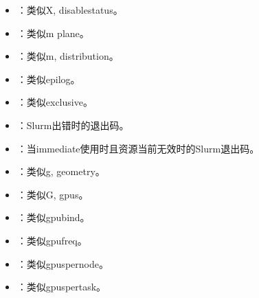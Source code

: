 \documentclass[a4paper,12pt,english]{sphinxmanual}
\begin{document}
\begin{itemize}
\item {} 
\sphinxAtStartPar
{}：类似\sphinxhyphen{}X, \sphinxhyphen{}\sphinxhyphen{}disable\sphinxhyphen{}status。

\item {} 
\sphinxAtStartPar
{}：类似\sphinxhyphen{}m plane。

\item {} 
\sphinxAtStartPar
{}：类似\sphinxhyphen{}m, \sphinxhyphen{}\sphinxhyphen{}distribution。

\item {} 
\sphinxAtStartPar
{}：类似\sphinxhyphen{}\sphinxhyphen{}epilog。

\item {} 
\sphinxAtStartPar
{}：类似\sphinxhyphen{}\sphinxhyphen{}exclusive。

\item {} 
\sphinxAtStartPar
{}：Slurm出错时的退出码。

\item {} 
\sphinxAtStartPar
{}：当\sphinxhyphen{}\sphinxhyphen{}immediate使用时且资源当前无效时的Slurm退出码。

\item {} 
\sphinxAtStartPar
{}：类似\sphinxhyphen{}g, \sphinxhyphen{}\sphinxhyphen{}geometry。

\item {} 
\sphinxAtStartPar
{}：类似\sphinxhyphen{}G, \sphinxhyphen{}\sphinxhyphen{}gpus。

\item {} 
\sphinxAtStartPar
{}：类似\sphinxhyphen{}\sphinxhyphen{}gpu\sphinxhyphen{}bind。

\item {} 
\sphinxAtStartPar
{}：类似\sphinxhyphen{}\sphinxhyphen{}gpu\sphinxhyphen{}freq。

\item {} 
\sphinxAtStartPar
{}：类似\sphinxhyphen{}\sphinxhyphen{}gpus\sphinxhyphen{}per\sphinxhyphen{}node。

\item {} 
\sphinxAtStartPar
{}：类似\sphinxhyphen{}\sphinxhyphen{}gpus\sphinxhyphen{}per\sphinxhyphen{}task。


\end{itemize}
\end{document}
